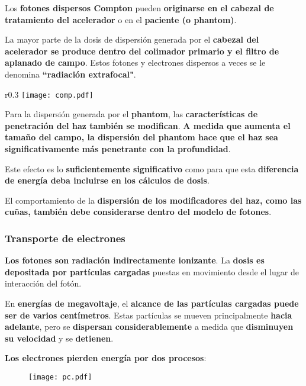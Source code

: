\documentclass[aspectratio=169,xcolor=dvipsnames,t]{beamer}
\begin{document}
\begin{frame}

    Los \textbf{fotones dispersos Compton} pueden \textbf{originarse en el cabezal de tratamiento del acelerador} o en el \textbf{paciente (o phantom)}.

    La mayor parte de la dosis de dispersión generada por el \textbf{cabezal del acelerador se produce dentro del colimador primario y el filtro de aplanado de campo}. Estos fotones y electrones dispersos a veces se le denomina \textbf{``radiación extrafocal"}.

    \begin{wrapfigure}{r}{0.3\textwidth}
        \centering
        \texttt{[image: comp.pdf]}
    \end{wrapfigure}

    Para la dispersión generada por el \textbf{phantom}, las \textbf{características de penetración del haz también se modifican}. \textbf{A medida que aumenta el tamaño del campo, la dispersión del phantom hace que el haz sea significativamente más penetrante con la profundidad}.

    Este efecto es lo \textbf{suficientemente significativo} como para que esta \textbf{diferencia de energía deba incluirse en los cálculos de dosis}. 
    
    El comportamiento de la \textbf{dispersión de los modificadores del haz, como las cuñas, también debe considerarse dentro del modelo de fotones}.

\end{frame}

\begin{frame}

    \frametitle{Transporte de electrones}

    \textbf{Los fotones son radiación indirectamente ionizante}. La \textbf{dosis es depositada por partículas cargadas} puestas en movimiento desde el lugar de interacción del fotón.

    En \textbf{energías de megavoltaje}, el \textbf{alcance de las partículas cargadas puede ser de varios centímetros}. Estas partículas se mueven principalmente \textbf{hacia adelante}, pero se \textbf{dispersan considerablemente} a medida que \textbf{disminuyen su velocidad} y se \textbf{detienen}.

    \textbf{Los electrones pierden energía por dos procesos}:

    \begin{figure}
        \centering
        \texttt{[image: pc.pdf]}
    \end{figure}

\end{frame}
\end{document}
